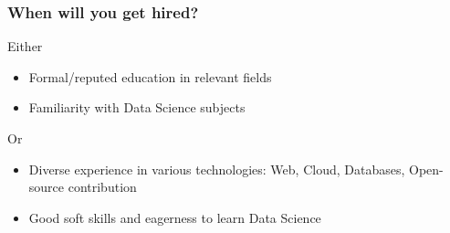 
\begin{frame}[fragile]\frametitle{When will you get hired?}
Either
\begin{itemize}
\item Formal/reputed education in relevant fields
\item Familiarity with Data Science subjects
\end{itemize}
Or
\begin{itemize}
\item Diverse experience in various technologies: Web, Cloud, Databases, Open-source contribution
\item Good soft skills and eagerness to learn Data Science
\end{itemize}
\end{frame}







